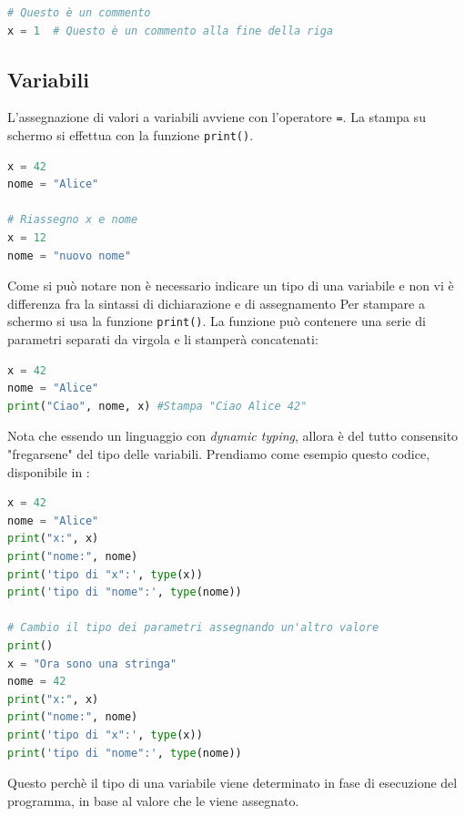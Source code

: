 \begin{lstlisting}[language = python, frame = none]
# Questo è un commento
x = 1  # Questo è un commento alla fine della riga
\end{lstlisting}

\subsection{Variabili}

L’assegnazione di valori a variabili avviene con l’operatore \texttt{=}. La stampa su schermo si effettua con la funzione \texttt{print()}.

\begin{lstlisting}[language = python, frame = none]
x = 42
nome = "Alice"

# Riassegno x e nome
x = 12
nome = "nuovo nome"
\end{lstlisting}
Come si può notare non è necessario indicare un tipo di una variabile e non vi è differenza fra la sintassi di dichiarazione e di assegnamento
\vskip3mm
Per stampare a schermo si usa la funzione \texttt{print()}. La funzione può contenere una serie di parametri separati da virgola e li stamperà concatenati:

\begin{lstlisting}[language = python, frame = none]
x = 42
nome = "Alice"
print("Ciao", nome, x) #Stampa "Ciao Alice 42"
\end{lstlisting}

Nota che essendo un linguaggio con \textit{dynamic typing}, allora è del tutto consensito "fregarsene" del tipo delle variabili. Prendiamo come esempio questo codice, disponibile in :
\begin{lstlisting}[language = python, frame = none]
x = 42
nome = "Alice"
print("x:", x)
print("nome:", nome)
print('tipo di "x":', type(x))
print('tipo di "nome":', type(nome))

# Cambio il tipo dei parametri assegnando un'altro valore
print()
x = "Ora sono una stringa"
nome = 42
print("x:", x)
print("nome:", nome)
print('tipo di "x":', type(x))
print('tipo di "nome":', type(nome))
\end{lstlisting}
Questo perchè il tipo di una variabile viene determinato in fase di esecuzione del programma, in base al valore che le viene assegnato.

